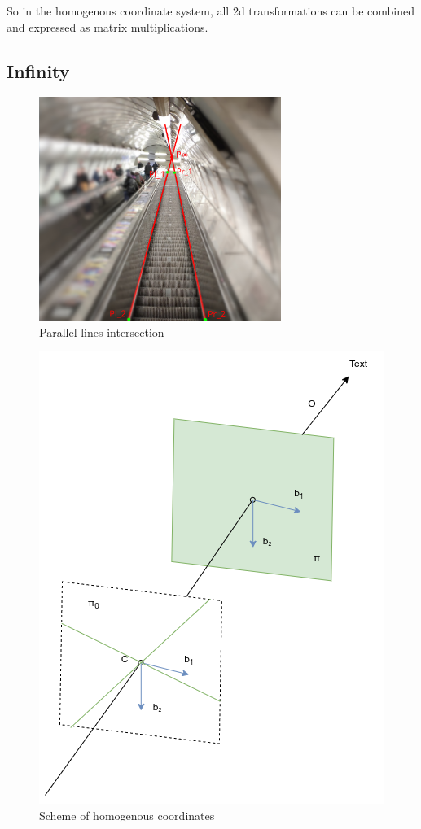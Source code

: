 So in the homogenous coordinate system, all 2d transformations can be combined and expressed as matrix multiplications.

\subsection{Infinity}
\begin{figure}[h]
    \centering
    \includegraphics[width=0.7\textwidth]{graphics/parallel_intersection.jpg}
    \caption{Parallel lines intersection}
    \label{fig:intersection_parallel}
\end{figure}

\begin{figure}[h]
    \centering
    \includegraphics[width=.5\textwidth]{graphics/homogenous.png}
    \caption{Scheme of homogenous coordinates}
    \label{fig:homogenous}
\end{figure}

